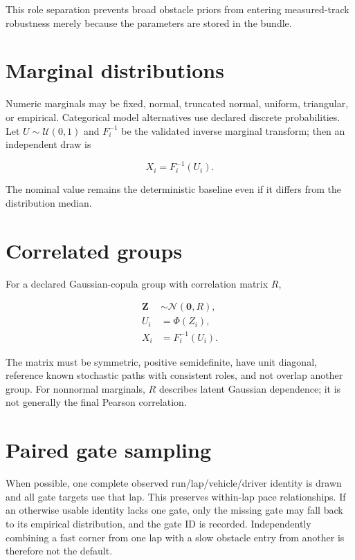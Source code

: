 \documentclass[11pt,oneside]{report}
\begin{document}
This role separation prevents broad obstacle priors from entering measured-track
robustness merely because the parameters are stored in the bundle.

\section{Marginal distributions}

Numeric marginals may be fixed, normal, truncated normal, uniform, triangular, or
empirical.  Categorical model alternatives use declared discrete probabilities.  Let
$U\sim\mathcal{U}(0,1)$ and $F_i^{-1}$ be the validated inverse marginal transform;
then an independent draw is

\begin{equation}
X_i=F_i^{-1}(U_i).
\end{equation}

The nominal value remains the deterministic baseline even if it differs from the
distribution median.

\section{Correlated groups}

For a declared Gaussian-copula group with correlation matrix $R$,

\begin{align}
\mathbf{Z}&\sim\mathcal{N}(\mathbf{0},R),\\
U_i&=\Phi(Z_i),\\
X_i&=F_i^{-1}(U_i).
\end{align}

The matrix must be symmetric, positive semidefinite, have unit diagonal, reference
known stochastic paths with consistent roles, and not overlap another group.  For
nonnormal marginals, $R$ describes latent Gaussian dependence; it is not generally the
final Pearson correlation.

\section{Paired gate sampling}\label{sec:paired-gates}

When possible, one complete observed run/lap/vehicle/driver identity is drawn and all
gate targets use that lap.  This preserves within-lap pace relationships.  If an
otherwise usable identity lacks one gate, only the missing gate may fall back to its
empirical distribution, and the gate ID is recorded.  Independently combining a fast
corner from one lap with a slow obstacle entry from another is therefore not the default.
\end{document}
